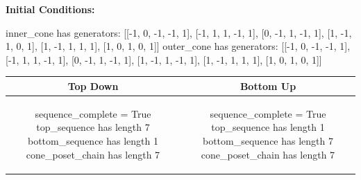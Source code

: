 \documentclass[10pt]{article}
\begin{document}
\textbf{Initial Conditions:}
\begin{SAGE}
inner_cone has generators: 
[[-1, 0, -1, -1, 1], [-1, 1, 1, -1, 1], [0, -1, 1, -1, 1], [1, -1, 1, 0, 1], [1, -1, 1, 1, 1], [1, 0, 1, 0, 1]]
outer_cone has generators: 
[[-1, 0, -1, -1, 1], [-1, 1, 1, -1, 1], [0, -1, 1, -1, 1], [1, -1, 1, -1, 1], [1, -1, 1, 1, 1], [1, 0, 1, 0, 1]]

\end{SAGE}
\begin{tabular}{c|c}
\textbf{Top Down} & \textbf{Bottom Up} \\ \hline  
\begin{SAGE}
sequence_complete = True
top_sequence has length 7
bottom_sequence has length 1
cone_poset_chain has length 7
\end{SAGE} 
&
\begin{SAGE}
sequence_complete = True
top_sequence has length 1
bottom_sequence has length 7
cone_poset_chain has length 7
\end{SAGE} 
\\ \hline


\end{tabular}
\end{document}
